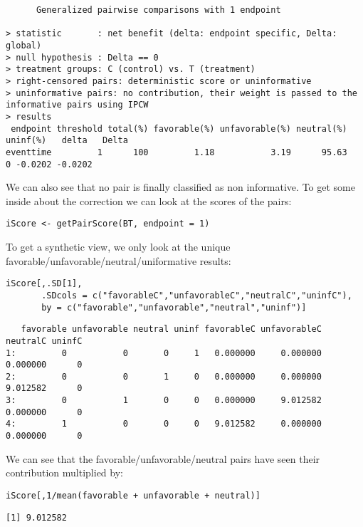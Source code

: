 \documentclass[12pt]{article}
\begin{document}
\begin{verbatim}
      Generalized pairwise comparisons with 1 endpoint

> statistic       : net benefit (delta: endpoint specific, Delta: global) 
> null hypothesis : Delta == 0 
> treatment groups: C (control) vs. T (treatment) 
> right-censored pairs: deterministic score or uninformative
> uninformative pairs: no contribution, their weight is passed to the informative pairs using IPCW
> results
 endpoint threshold total(%) favorable(%) unfavorable(%) neutral(%) uninf(%)   delta   Delta
eventtime         1      100         1.18           3.19      95.63        0 -0.0202 -0.0202
\end{verbatim}


We can also see that no pair is finally classified as non
informative. To get some inside about the correction we can look at
the scores of the pairs:
\lstset{language=r,label= ,caption= ,captionpos=b,numbers=none}
\begin{lstlisting}
iScore <- getPairScore(BT, endpoint = 1)
\end{lstlisting}

To get a synthetic view, we only look at the unique
favorable/unfavorable/neutral/uniformative results:
\lstset{language=r,label= ,caption= ,captionpos=b,numbers=none}
\begin{lstlisting}
iScore[,.SD[1], 
       .SDcols = c("favorableC","unfavorableC","neutralC","uninfC"),
       by = c("favorable","unfavorable","neutral","uninf")]
\end{lstlisting}

\begin{verbatim}
   favorable unfavorable neutral uninf favorableC unfavorableC neutralC uninfC
1:         0           0       0     1   0.000000     0.000000 0.000000      0
2:         0           0       1     0   0.000000     0.000000 9.012582      0
3:         0           1       0     0   0.000000     9.012582 0.000000      0
4:         1           0       0     0   9.012582     0.000000 0.000000      0
\end{verbatim}

We can see that the favorable/unfavorable/neutral pairs have seen
their contribution multiplied by:
\lstset{language=r,label= ,caption= ,captionpos=b,numbers=none}
\begin{lstlisting}
iScore[,1/mean(favorable + unfavorable + neutral)]
\end{lstlisting}

\begin{verbatim}
[1] 9.012582
\end{verbatim}
\end{document}
